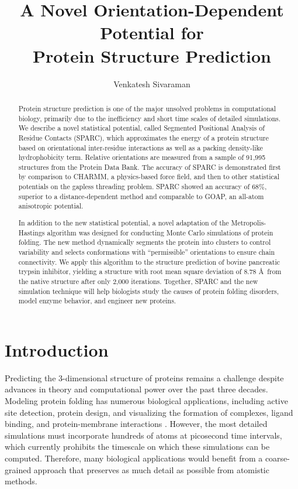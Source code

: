 \documentclass[11pt,titlepage]{article}
\title{A Novel Orientation-Dependent Potential for \\Protein Structure Prediction}
\author{Venkatesh Sivaraman}
\begin{document}
\maketitle

\raggedbottom

\begin{abstract}
Protein structure prediction is one of the major unsolved problems in computational biology, primarily due to the inefficiency and short time scales of detailed simulations. We describe a novel statistical potential, called Segmented Positional Analysis of Residue Contacts (SPARC), which approximates the energy of a protein structure based on orientational inter-residue interactions as well as a packing density-like hydrophobicity term. Relative orientations are measured from a sample of 91,995 structures from the Protein Data Bank. The accuracy of SPARC is demonstrated first by comparison to CHARMM, a physics-based force field, and then to other statistical potentials on the gapless threading problem. SPARC showed an accuracy of 68\%, superior to a distance-dependent method and comparable to GOAP, an all-atom anisotropic potential.

In addition to the new statistical potential, a novel adaptation of the Metropolis-Hastings algorithm was designed for conducting Monte Carlo simulations of protein folding. The new method dynamically segments the protein into clusters to control variability and selects conformations with ``permissible'' orientations to ensure chain connectivity. We apply this algorithm to the structure prediction of bovine pancreatic trypsin inhibitor, yielding a structure with root mean square deviation of 8.78 \AA\, from the native structure after only 2,000 iterations. Together, SPARC and the new simulation technique will help biologists study the causes of protein folding disorders, model enzyme behavior, and engineer new proteins.
\end{abstract}

\section{Introduction}
Predicting the 3-dimensional structure of proteins remains a challenge despite advances in theory and computational power over the past three decades.
Modeling protein folding has numerous biological applications, including active site detection, protein design, and visualizing the formation of complexes, ligand binding, and protein-membrane interactions \cite{baker2,kouza,monticelli}.
However, the most detailed simulations must incorporate hundreds of atoms at picosecond time intervals, which currently prohibits the timescale on which these simulations can be computed.
Therefore, many biological applications would benefit from a coarse-grained approach that preserves as much detail as possible from atomistic methods.
\end{document}
